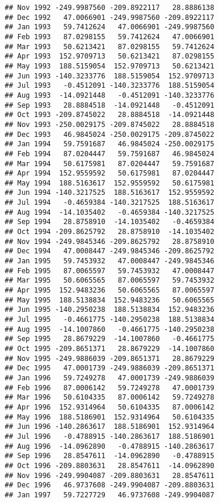 \documentclass[]{article}
\begin{document}
\begin{verbatim}
## Nov 1992 -249.9987560 -209.8922117   28.8886138
## Dec 1992   47.0066901 -249.9987560 -209.8922117
## Jan 1993   59.7412624   47.0066901 -249.9987560
## Feb 1993   87.0298155   59.7412624   47.0066901
## Mar 1993   50.6213421   87.0298155   59.7412624
## Apr 1993  152.9709713   50.6213421   87.0298155
## May 1993  188.5159054  152.9709713   50.6213421
## Jun 1993 -140.3233776  188.5159054  152.9709713
## Jul 1993   -0.4512091 -140.3233776  188.5159054
## Aug 1993  -14.0921448   -0.4512091 -140.3233776
## Sep 1993   28.8884518  -14.0921448   -0.4512091
## Oct 1993 -209.8745022   28.8884518  -14.0921448
## Nov 1993 -250.0029175 -209.8745022   28.8884518
## Dec 1993   46.9845024 -250.0029175 -209.8745022
## Jan 1994   59.7591687   46.9845024 -250.0029175
## Feb 1994   87.0204447   59.7591687   46.9845024
## Mar 1994   50.6175981   87.0204447   59.7591687
## Apr 1994  152.9559592   50.6175981   87.0204447
## May 1994  188.5163617  152.9559592   50.6175981
## Jun 1994 -140.3217525  188.5163617  152.9559592
## Jul 1994   -0.4659384 -140.3217525  188.5163617
## Aug 1994  -14.1035402   -0.4659384 -140.3217525
## Sep 1994   28.8758910  -14.1035402   -0.4659384
## Oct 1994 -209.8625792   28.8758910  -14.1035402
## Nov 1994 -249.9845346 -209.8625792   28.8758910
## Dec 1994   47.0008447 -249.9845346 -209.8625792
## Jan 1995   59.7453932   47.0008447 -249.9845346
## Feb 1995   87.0065597   59.7453932   47.0008447
## Mar 1995   50.6065565   87.0065597   59.7453932
## Apr 1995  152.9483236   50.6065565   87.0065597
## May 1995  188.5138834  152.9483236   50.6065565
## Jun 1995 -140.2950238  188.5138834  152.9483236
## Jul 1995   -0.4661775 -140.2950238  188.5138834
## Aug 1995  -14.1007860   -0.4661775 -140.2950238
## Sep 1995   28.8679229  -14.1007860   -0.4661775
## Oct 1995 -209.8651371   28.8679229  -14.1007860
## Nov 1995 -249.9886039 -209.8651371   28.8679229
## Dec 1995   47.0001739 -249.9886039 -209.8651371
## Jan 1996   59.7249278   47.0001739 -249.9886039
## Feb 1996   87.0006142   59.7249278   47.0001739
## Mar 1996   50.6104335   87.0006142   59.7249278
## Apr 1996  152.9314964   50.6104335   87.0006142
## May 1996  188.5186901  152.9314964   50.6104335
## Jun 1996 -140.2863617  188.5186901  152.9314964
## Jul 1996   -0.4788915 -140.2863617  188.5186901
## Aug 1996  -14.0962890   -0.4788915 -140.2863617
## Sep 1996   28.8547611  -14.0962890   -0.4788915
## Oct 1996 -209.8803631   28.8547611  -14.0962890
## Nov 1996 -249.9904087 -209.8803631   28.8547611
## Dec 1996   46.9737608 -249.9904087 -209.8803631
## Jan 1997   59.7227729   46.9737608 -249.9904087

\end{verbatim}
\end{document}
